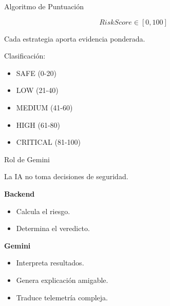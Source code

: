 \documentclass{beamer}
\begin{document}
\begin{frame}{Algoritmo de Puntuación}

\[
RiskScore \in [0,100]
\]

Cada estrategia aporta evidencia ponderada.

\vspace{0.5cm}

Clasificación:

\begin{itemize}
\item SAFE (0-20)
\item LOW (21-40)
\item MEDIUM (41-60)
\item HIGH (61-80)
\item CRITICAL (81-100)
\end{itemize}

\end{frame}

\begin{frame}{Rol de Gemini}

La IA no toma decisiones de seguridad.

\vspace{0.5cm}

\textbf{Backend}
\begin{itemize}
\item Calcula el riesgo.
\item Determina el veredicto.
\end{itemize}

\textbf{Gemini}
\begin{itemize}
\item Interpreta resultados.
\item Genera explicación amigable.
\item Traduce telemetría compleja.
\end{itemize}

\end{frame}
\end{document}

